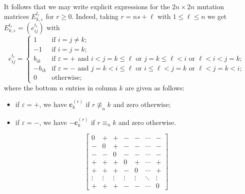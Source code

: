 \documentclass{amsart}
\numberwithin{theorem}{section}
\newcommand{\bfc}{\boldsymbol{c}}
\begin{document}
  It follows that we may write explicit expressions for the $2n\times 2n$ mutation matrices $E^{t_r}_{k,\varepsilon}$ for $r\ge0$.
  Indeed, taking $r=ns+\ell$ with $1 \le \ell \le n$ we get $E^{t_r}_{k,\varepsilon}=(e^{t_r}_{ij})$ with
  \begin{equation}
    \label{eq:preprojective mutation matrices}
    e^{t_r}_{ij}=\begin{cases} 1 & \text{if $i=j\ne k$;}\\ -1 & \text{if $i=j=k$;}\\ b_{ik} & \text{if $\varepsilon=+$ and $i<j=k\le\ell$ or $j=k\le\ell<i$ or $\ell<i<j=k$;}\\ -b_{ik} & \text{if $\varepsilon=-$ and $j=k<i\le\ell$ or $i\le\ell<j=k$ or $\ell<j=k<i$;} \\ 0 & \text{otherwise;} \end{cases}
  \end{equation}
  where the bottom $n$ entries in column $k$ are given as follows:
  \begin{itemize}
    \item if $\varepsilon=+$, we have $\bfc^{(r)}_k$ if $r\not\equiv_n k$ and zero otherwise;
    \item if $\varepsilon=-$, we have $-\bfc^{(r)}_k$ if $r\equiv_n k$ and zero otherwise.
  \end{itemize}

  \[
    \left[\begin{array}{cc|c|cccc}
      0 & + & + & - & - & \cdots & -\\
      - & 0 & + & - & - & \cdots & -\\
      \hline
      - & - & 0 & - & - & \cdots & -\\
      \hline
      + & + & + & 0 & + & \cdots & +\\
      + & + & + & - & 0 & \cdots & +\\
      \vdots & \vdots & \vdots & \vdots & \vdots & \ddots & \vdots\\
      + & + & + & - & - & \cdots & 0
    \end{array}\right]
  \]
\end{document}
